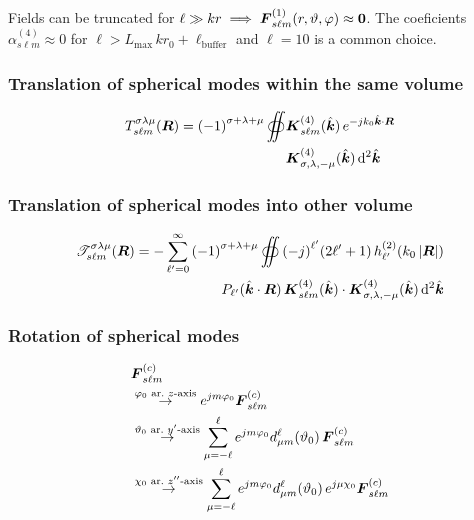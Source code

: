Fields can be truncated for $\ell \gg kr \implies \boldsymbol{F}_{s\ell m}^{(1)}(r,\vartheta,\varphi) \approx \boldsymbol{0}$. The coeficients $\alpha_{s\ell m}^{(4)}\approx0$ for $\ell > L_{\max}\,kr_{0} + \ell_{\text{buffer}}$ and $\ell = 10$ is a common choice.

\subsubsection{Translation of spherical modes within the same volume}
\begin{align*}
  T_{s\ell m}^{\sigma\lambda\mu}(\boldsymbol{R}) = {(-1)}^{\sigma+\lambda+\mu} \oiint &\boldsymbol{K}_{s\ell m}^{(4)}(\hat{\boldsymbol{k}})\,e^{-jk_{0}\hat{\boldsymbol{k}}\cdot\boldsymbol{R}}\\
  &\boldsymbol{K}_{\sigma,\lambda,-\mu}^{(4)}(\hat{\boldsymbol{k}})\,\mathrm{d^{2}}\hat{\boldsymbol{k}}
\end{align*}

\subsubsection{Translation of spherical modes into other volume}
\begin{align*}
  \mathscr{T}_{s\ell m}^{\sigma\lambda\mu}(\boldsymbol{R})= -\sum\limits_{\ell'=0}^{\infty}{(-1)}^{\sigma+\lambda+\mu}
  \oiint {(-j)}^{\ell'} (2\ell'+1) \, h_{\ell'}^{(2)}(k_{0}\,|\boldsymbol{R}|)\\
  P_{\ell'}(\hat{\boldsymbol{k}}\cdot\boldsymbol{R}) \, \boldsymbol{K}_{s\ell m}^{(4)}(\hat{\boldsymbol{k}}) \cdot \boldsymbol{K}_{\sigma,\lambda,-\mu}^{(4)}(\hat{\boldsymbol{k}}) \, \mathrm{d^{2}}\hat{\boldsymbol{k}}
\end{align*}

\subsubsection{Rotation of spherical modes}
\begin{align*}
  &\boldsymbol{F}_{s\ell m}^{(c)}\\
  &\overset{\varphi_{0}\text{ ar.\ $z$-axis}}{\to} e^{jm\varphi_{0}}\boldsymbol{F}_{s\ell m}^{(c)}\\
  &\overset{\vartheta_{0}\text{ ar.\ $y'$-axis}}{\to} \sum\limits_{\mu=-\ell}^{\ell}e^{jm\varphi_{0}} d_{\mu m}^{\ell}(\vartheta_{0}) \, \boldsymbol{F}_{s\ell m}^{(c)}\\
  &\overset{\chi_{0}\text{ ar.\ $z''$-axis}}{\to} \sum\limits_{\mu=-\ell}^{\ell}e^{jm\varphi_{0}} d_{\mu m}^{\ell}(\vartheta_{0}) \, e^{j\mu\chi_{0}} \boldsymbol{F}_{s\ell m}^{(c)}\\
\end{align*}

